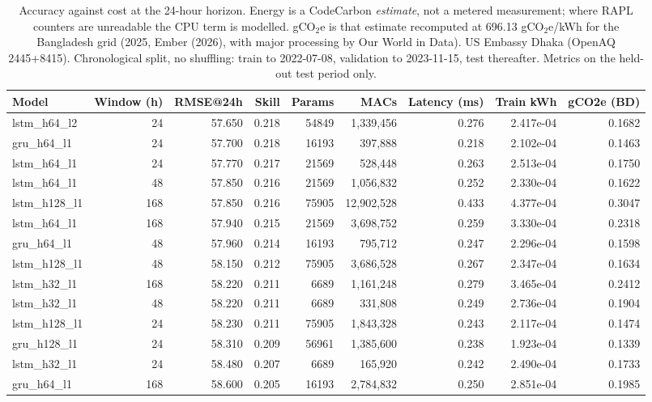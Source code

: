 \begin{table}[htbp]
\caption{Accuracy against cost at the 24-hour horizon. Energy is a CodeCarbon \emph{estimate}, not a metered measurement; where RAPL counters are unreadable the CPU term is modelled. gCO$_2$e is that estimate recomputed at 696.13 gCO$_2$e/kWh for the Bangladesh grid (2025, Ember (2026), with major processing by Our World in Data). US Embassy Dhaka (OpenAQ 2445+8415). Chronological split, no shuffling: train to 2022-07-08, validation to 2023-11-15, test thereafter. Metrics on the held-out test period only.}
\label{tab:green_efficiency}
\begin{tabular}{lrrrrrrrr}
\toprule
Model & Window (h) & RMSE@24h & Skill & Params & MACs & Latency (ms) & Train kWh & gCO2e (BD) \\
\midrule
lstm\_h64\_l2 & 24 & 57.650 & 0.218 & 54849 & 1,339,456 & 0.276 & 2.417e-04 & 0.1682 \\
gru\_h64\_l1 & 24 & 57.700 & 0.218 & 16193 & 397,888 & 0.218 & 2.102e-04 & 0.1463 \\
lstm\_h64\_l1 & 24 & 57.770 & 0.217 & 21569 & 528,448 & 0.263 & 2.513e-04 & 0.1750 \\
lstm\_h64\_l1 & 48 & 57.850 & 0.216 & 21569 & 1,056,832 & 0.252 & 2.330e-04 & 0.1622 \\
lstm\_h128\_l1 & 168 & 57.850 & 0.216 & 75905 & 12,902,528 & 0.433 & 4.377e-04 & 0.3047 \\
lstm\_h64\_l1 & 168 & 57.940 & 0.215 & 21569 & 3,698,752 & 0.259 & 3.330e-04 & 0.2318 \\
gru\_h64\_l1 & 48 & 57.960 & 0.214 & 16193 & 795,712 & 0.247 & 2.296e-04 & 0.1598 \\
lstm\_h128\_l1 & 48 & 58.150 & 0.212 & 75905 & 3,686,528 & 0.267 & 2.347e-04 & 0.1634 \\
lstm\_h32\_l1 & 168 & 58.220 & 0.211 & 6689 & 1,161,248 & 0.279 & 3.465e-04 & 0.2412 \\
lstm\_h32\_l1 & 48 & 58.220 & 0.211 & 6689 & 331,808 & 0.249 & 2.736e-04 & 0.1904 \\
lstm\_h128\_l1 & 24 & 58.230 & 0.211 & 75905 & 1,843,328 & 0.243 & 2.117e-04 & 0.1474 \\
gru\_h128\_l1 & 24 & 58.310 & 0.209 & 56961 & 1,385,600 & 0.238 & 1.923e-04 & 0.1339 \\
lstm\_h32\_l1 & 24 & 58.480 & 0.207 & 6689 & 165,920 & 0.242 & 2.490e-04 & 0.1733 \\
gru\_h64\_l1 & 168 & 58.600 & 0.205 & 16193 & 2,784,832 & 0.250 & 2.851e-04 & 0.1985 \\

\end{tabular}
\end{table}
